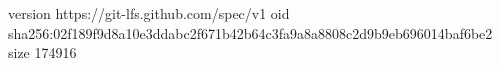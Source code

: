version https://git-lfs.github.com/spec/v1
oid sha256:02f189f9d8a10e3ddabc2f671b42b64c3fa9a8a8808c2d9b9eb696014baf6be2
size 174916
